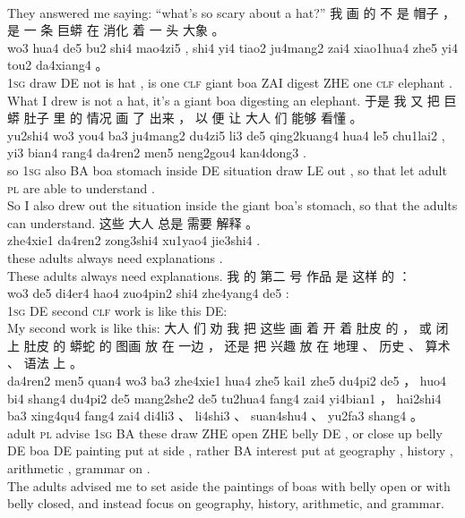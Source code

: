 \documentclass[UTF8]{ctexart}
\begin{document}
\begin{exe}
\\
\trans They answered me saying: ``what's so scary about a hat?''
\ex
\glll
我 画 的 不 是 帽子 ， 是 一 条 巨蟒 在 消化 着 一 头 大象 。
\\
wo3 hua4 de5 bu2 shi4 mao4zi5 , shi4 yi4 tiao2 ju4mang2 zai4 xiao1hua4 zhe5 yi4 tou2 da4xiang4 。
\\
\textsc{1sg} draw DE not is hat , is one \textsc{clf} {giant boa} ZAI digest ZHE one \textsc{clf} elephant . 
\\
\trans What I drew is not a hat, it's a giant boa digesting an elephant. 
\ex
\glll
于是 我 又 把 巨蟒 肚子 里 的 情况 画 了 出来 ， 以 便 让 大人 们 能够 看懂 。
\\
yu2shi4 wo3 you4 ba3 ju4mang2 du4zi5 li3 de5 qing2kuang4 hua4 le5 chu1lai2 , yi3 bian4 rang4 da4ren2 men5 neng2gou4 kan4dong3 . 
\\
so \textsc{1sg} also BA boa stomach inside DE situation draw LE out , {} {so that} let adult \textsc{pl} {are able to} {understand} . 
\\
\trans So I also drew out the situation inside the giant boa's stomach, so that the adults can understand. 
\ex
\glll
这些 大人 总是 需要 解释 。
\\
zhe4xie1 da4ren2 zong3shi4 xu1yao4 jie3shi4 . 
\\
these adults always need explanations .
\\
\trans These adults always need explanations.
\ex
\glll
我 的 第二 号 作品 是 这样 的 ：
\\
wo3 de5 di4er4 hao4 zuo4pin2 shi4 zhe4yang4 de5 :
\\
\textsc{1sg} DE second \textsc{clf} work is {like this} DE:
\\
\trans My second work is like this:
\ex
\glll
大人 们 劝 我 把 这些 画 着 开 着 肚皮 的 ， 或 闭 上 肚皮 的 蟒蛇 的 图画 放 在 一边 ， 还是 把 兴趣 放 在 地理 、 历史 、 算术 、 语法 上 。
\\
da4ren2 men5 quan4 wo3 ba3 zhe4xie1 hua4 zhe5 kai1 zhe5 du4pi2 de5 ， huo4 bi4 shang4 du4pi2 de5 mang2she2 de5 tu2hua4 fang4 zai4 yi4bian1 ， hai2shi4 ba3 xing4qu4 fang4 zai4 di4li3 、 li4shi3 、 suan4shu4 、 yu2fa3 shang4 。
\\
adult \textsc{pl} advise \textsc{1sg} BA these draw ZHE open ZHE belly DE , or close up belly DE boa DE painting put at side , rather BA interest put at geography , history , arithmetic , grammar on .
\\
\trans The adults advised me to set aside the paintings of boas with belly open or with belly closed, and instead focus on geography, history, arithmetic, and grammar. 

\end{exe}
\end{document}

